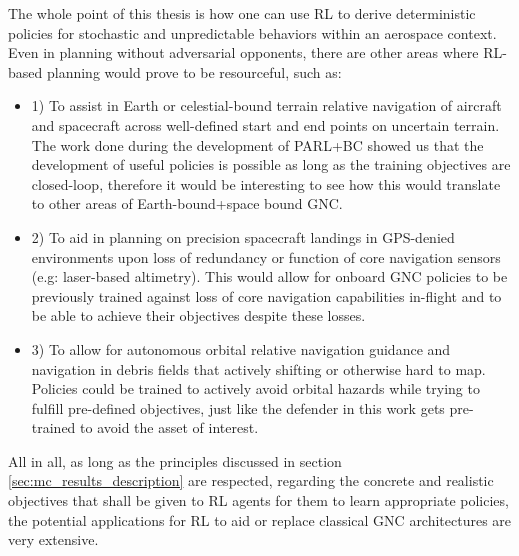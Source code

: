 The whole point of this thesis is how one can use RL to derive deterministic policies for stochastic and unpredictable behaviors within an aerospace context. Even in planning without adversarial opponents, there are other areas where RL-based planning would prove to be resourceful, such as:

\begin{itemize}

    \item 1) To assist in Earth or celestial-bound terrain relative navigation of aircraft and spacecraft across well-defined start and end points on uncertain terrain. The work done during the development of PARL+BC showed us that the development of useful policies is possible as long as the training objectives are closed-loop, therefore it would be interesting to see how this would translate to other areas of Earth-bound+space bound GNC.
    
    
    \item 2) To aid in planning on precision spacecraft landings in GPS-denied environments upon loss of redundancy or function of core navigation sensors (e.g: laser-based altimetry). This would allow for onboard GNC policies to be previously trained against loss of core navigation capabilities in-flight and to be able to achieve their objectives despite these losses.

    \item 3) To allow for autonomous orbital relative navigation guidance and navigation in debris fields that actively shifting or otherwise hard to map. Policies could be trained to actively avoid orbital hazards while trying to fulfill pre-defined objectives, just like the defender in this work gets pre-trained to avoid the asset of interest.
\end{itemize}


All in all, as long as the principles discussed in section \ref{sec:mc_results_description} are respected, regarding the concrete and realistic objectives that shall be given to RL agents for them to learn appropriate policies, the potential applications for RL to aid or replace classical GNC architectures are very extensive.
